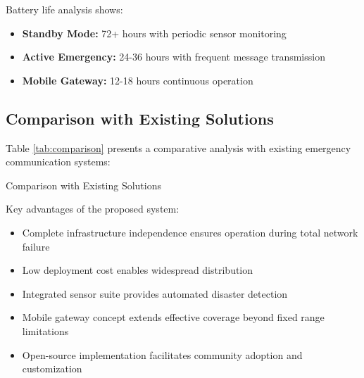 \documentclass[conference]{IEEEtran}
\begin{document}
Battery life analysis shows:
\begin{itemize}
\item \textbf{Standby Mode:} 72+ hours with periodic sensor monitoring
\item \textbf{Active Emergency:} 24-36 hours with frequent message transmission
\item \textbf{Mobile Gateway:} 12-18 hours continuous operation
\end{itemize}

\subsection{Comparison with Existing Solutions}

Table \ref{tab:comparison} presents a comparative analysis with existing emergency communication systems:

\begin{table}[htbp]
\centering
\caption{Comparison with Existing Solutions}
\label{tab:comparison}
\caption*{*Coverage extended via mobile gateways}
\end{table}

Key advantages of the proposed system:
\begin{itemize}
\item Complete infrastructure independence ensures operation during total network failure
\item Low deployment cost enables widespread distribution
\item Integrated sensor suite provides automated disaster detection
\item Mobile gateway concept extends effective coverage beyond fixed range limitations
\item Open-source implementation facilitates community adoption and customization
\end{itemize}
\end{document}
